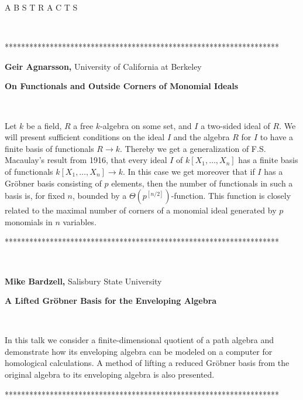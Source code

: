 \documentclass[12pt]{article}
\begin{document}
\begin{center}
{\Large {A B S T R A C T S } }

{\normalsize \smallskip\ }

{\normalsize %
******************************************************************* }
\end{center}

\vspace{.1in}

\noindent \textbf{Geir Agnarsson, }University of California at Berkeley

\noindent \textbf{On Functionals and Outside Corners of Monomial Ideals}

\smallskip\ 

\noindent Let $k$ be a field, $R$ a free $k$-algebra on some set, and $I$ a
two-sided ideal of $R$. We will present sufficient conditions on the ideal $%
I $ and the algebra $R$ for $I$ to have a finite basis of functionals $%
R\rightarrow k$. Thereby we get a generalization of F.S. Macaulay's result
from 1916, that every ideal $I$ of $k[X_1,\ldots ,X_n]$ has a finite basis
of functionals $k[X_1,\ldots ,X_n]\rightarrow k$. In this case we get
moreover that if $I$ has a Gr\"{o}bner basis consisting of $p$ elements,
then the number of functionals in such a basis is, for fixed $n$, bounded by
a $\Theta (p^{[n/2]})$-function. This function is closely related to the
maximal number of corners of a monomial ideal generated by $p$ monomials in $%
n$ variables.

\begin{center}
*******************************************************************
\end{center}

\vspace{.1in}\ 

\noindent \textbf{Mike Bardzell, }Salisbury State University

\noindent \textbf{A Lifted Gr\"{o}bner Basis for the Enveloping Algebra}

\smallskip\ 

\noindent In this talk we consider a finite-dimensional quotient of a path
algebra and demonstrate how its enveloping algebra can be modeled on a
computer for homological calculations. A method of lifting a reduced
Gr\"{o}bner basis from the original algebra to its enveloping algebra is
also presented.

\begin{center}
*******************************************************************
\end{center}
\end{document}
